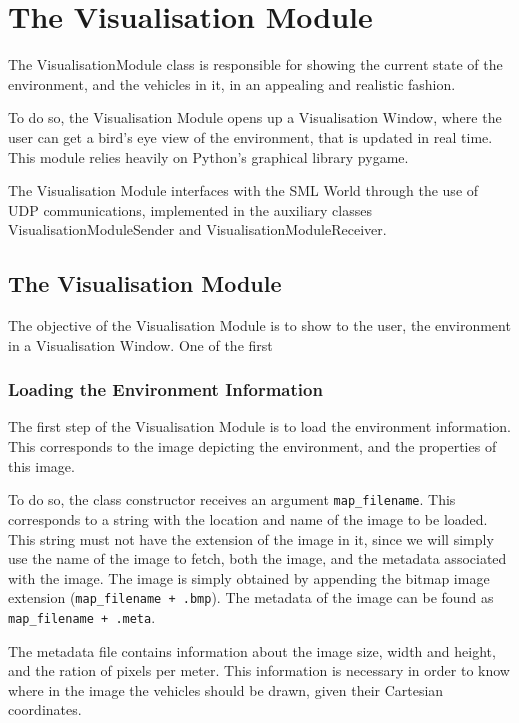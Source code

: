 
\section{The Visualisation Module}
\label{sec:the_visualisation_module}

The VisualisationModule class is responsible for showing the current state of the environment, and the vehicles in it, in an appealing and realistic fashion.

To do so, the Visualisation Module opens up a Visualisation Window, where the user can get a bird's eye view of the environment, that is updated in real time. This module relies heavily on Python's graphical library pygame.

The Visualisation Module interfaces with the SML World through the use of UDP communications, implemented in the auxiliary classes VisualisationModuleSender and VisualisationModuleReceiver.

\subsection{The Visualisation Module}

The objective of the Visualisation Module is to show to the user, the environment in a Visualisation Window. One of the first 

\subsubsection{Loading the Environment Information}

The first step of the Visualisation Module is to load the environment information. This corresponds to the image depicting the environment, and the properties of this image.

To do so, the class constructor receives an argument \texttt{map\_filename}. This corresponds to a string with the location and name of the image to be loaded. This string must not have the extension of the image in it, since we will simply use the name of the image to fetch, both the image, and the metadata associated with the image. The image is simply obtained by appending the bitmap image extension (\texttt{map\_filename + .bmp}). The metadata of the image can be found as \texttt{map\_filename + .meta}.

The metadata file contains information about the image size, width and height, and the ration of pixels per meter. This information is necessary in order to know where in the image the vehicles should be drawn, given their Cartesian coordinates.

